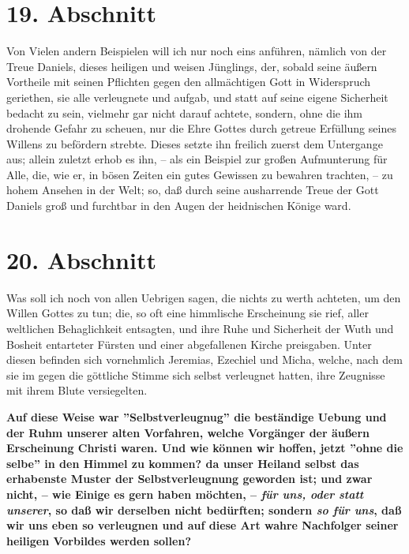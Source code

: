 \section{19. Abschnitt} \label{kap4_ab19}

Von Vielen andern Beispielen will ich nur noch eins anführen, nämlich von der
Treue Daniels, dieses heiligen und weisen Jünglings, der, sobald seine äußern
Vortheile mit seinen Pflichten gegen den allmächtigen Gott in Widerspruch
geriethen, sie alle verleugnete und aufgab, und statt auf seine eigene
Sicherheit bedacht zu sein, vielmehr gar nicht darauf achtete, sondern, ohne die
ihm drohende Gefahr zu scheuen, nur die Ehre Gottes durch getreue Erfüllung
seines Willens zu befördern strebte. Dieses setzte ihn freilich zuerst dem
Untergange aus; allein zuletzt erhob es ihn, -- als ein Beispiel zur großen
Aufmunterung für Alle, die, wie er, in bösen Zeiten ein gutes Gewissen zu
bewahren trachten, -- zu hohem Ansehen in der Welt; so, daß durch seine
ausharrende Treue der Gott Daniels groß und furchtbar in den Augen der
heidnischen Könige ward.

\section{20. Abschnitt} \label{kap4_ab20}

Was soll ich noch von allen Uebrigen sagen, die nichts zu werth achteten, um den
Willen Gottes zu tun; die, so oft eine himmlische Erscheinung sie rief, aller
weltlichen Behaglichkeit entsagten, und ihre Ruhe und Sicherheit der Wuth und
Bosheit entarteter Fürsten und einer abgefallenen Kirche preisgaben. Unter
diesen befinden sich vornehmlich Jeremias, Ezechiel und Micha, welche, nach dem
sie im gegen die göttliche Stimme sich selbst verleugnet hatten, ihre Zeugnisse
mit ihrem Blute versiegelten.

\medskip

  \textbf{Auf diese Weise war ''Selbstverleugnug'' die beständige Uebung und der Ruhm
unserer alten Vorfahren, welche Vorgänger der äußern Erscheinung Christi waren.
Und wie können wir hoffen, jetzt ''ohne die selbe'' in den Himmel zu kommen? da
unser Heiland selbst das erhabenste Muster der Selbstverleugnung geworden ist;
und zwar nicht, -- wie Einige es gern haben möchten, -- \textit{für uns, oder statt
unserer}, so daß wir derselben nicht bedürften; sondern \textit{so für uns}, daß wir
uns eben so verleugnen und auf diese Art wahre Nachfolger seiner heiligen
Vorbildes werden sollen?}


